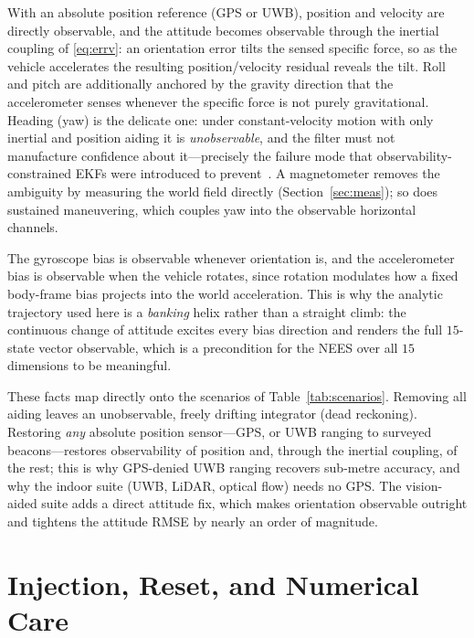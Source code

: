\documentclass[11pt]{article}
\begin{document}
With an absolute position reference (GPS or UWB), position and velocity are directly observable, and the
attitude becomes observable through the inertial coupling of \eqref{eq:errv}: an orientation error tilts
the sensed specific force, so as the vehicle accelerates the resulting position/velocity residual
reveals the tilt. Roll and pitch are additionally anchored by the gravity direction that the
accelerometer senses whenever the specific force is not purely gravitational. Heading (yaw) is the
delicate one: under constant-velocity motion with only inertial and position aiding it is
\emph{unobservable}, and the filter must not manufacture confidence about it---precisely the failure
mode that observability-constrained EKFs were introduced to prevent~\cite{hesch2014,martinelli2012}. A
magnetometer removes the ambiguity by measuring the world field directly (Section~\ref{sec:meas}); so
does sustained maneuvering, which couples yaw into the observable horizontal channels.

The gyroscope bias is observable whenever orientation is, and the accelerometer bias is observable when
the vehicle rotates, since rotation modulates how a fixed body-frame bias projects into the world
acceleration. This is why the analytic trajectory used here is a \emph{banking} helix rather than a
straight climb: the continuous change of attitude excites every bias direction and renders the full
$15$-state vector observable, which is a precondition for the NEES over all $15$ dimensions to be
meaningful.

These facts map directly onto the scenarios of Table~\ref{tab:scenarios}. Removing all aiding leaves an
unobservable, freely drifting integrator (dead reckoning). Restoring \emph{any} absolute position
sensor---GPS, or UWB ranging to surveyed beacons---restores observability of position and, through the
inertial coupling, of the rest; this is why GPS-denied UWB ranging recovers sub-metre accuracy, and why
the indoor suite (UWB, LiDAR, optical flow) needs no GPS. The vision-aided suite adds a direct attitude
fix, which makes orientation observable outright and tightens the attitude RMSE by nearly an order of
magnitude.

\section{Injection, Reset, and Numerical Care}
\label{sec:inject}
\end{document}
